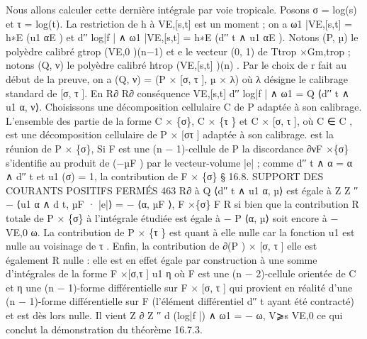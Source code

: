 \documentclass[
  10pt,
]{article}
\newenvironment{Shaded}{}{}
\newcommand{\NormalTok}[1]{#1}
\begin{document}
\begin{Shaded}
\begin{Highlighting}[]
\NormalTok{Nous allons calculer cette dernière intégrale par voie tropicale. Posons σ = log(s) et}
\NormalTok{τ = log(t). La restriction de h à VE,[s,t] est un moment ; on a ω1 |VE,[s,t] = h∗E (u1 αE ) et}
\NormalTok{d′′ log|f | ∧ ω1 |VE,[s,t] = h∗E (d′′ t ∧ u1 αE ).}
\NormalTok{   Notons (P, µ) le polyèdre calibré gtrop (VE,0 )(n−1) et e le vecteur (0, 1) de Ttrop ×Gm,trop ;}
\NormalTok{notons (Q, ν) le polyèdre calibré htrop (VE,[s,t] )(n) . Par le choix de r fait au début de la}
\NormalTok{preuve, on a (Q, ν) = (P × [σ, τ ], µ × λ) où λ désigne le calibrage standard de [σ, τ ]. En}
\NormalTok{                R∂                            R∂}
\NormalTok{conséquence VE,[s,t] d′′ log|f | ∧ ω1 = Q ⟨d′′ t ∧ u1 α, ν⟩.}
\NormalTok{   Choisissons une décomposition cellulaire C de P adaptée à son calibrage. L’ensemble}
\NormalTok{des partie de la forme C × \{σ\}, C × \{τ \} et C × [σ, τ ], où C ∈ C , est une décomposition}
\NormalTok{cellulaire de P × [στ ] adaptée à son calibrage. est la réunion de P × \{σ\}, Si F est}
\NormalTok{une (n − 1){-}cellule de P la discordance ∂νF ×\{σ\} s’identifie au produit de (−µF ) par le}
\NormalTok{vecteur{-}volume |e| ; comme d′′ t ∧ α = α ∧ d′′ t et u1 (σ) = 1, la contribution de F × \{σ\}}
\NormalTok{                         § 16.8. SUPPORT DES COURANTS POSITIFS FERMÉS                            463}
\NormalTok{    R∂}
\NormalTok{à   Q}
\NormalTok{         ⟨d′′ t ∧ u1 α, µ⟩ est égale à}
\NormalTok{                                Z                                Z}
\NormalTok{                                                ′′}
\NormalTok{                              −        ⟨u1 α ∧ d t, µF · |e|⟩ = − ⟨α, µF ⟩,}
\NormalTok{                               F ×\{σ\}                            F}
\NormalTok{                                                                                   R}
\NormalTok{si bien que la contribution}
\NormalTok{                 R           totale de P × \{σ\} à l’intégrale étudiée est égale à − P ⟨α, µ⟩}
\NormalTok{soit encore à − VE,0 ω.}
\NormalTok{   La contribution de P × \{τ \} est quant à elle nulle car la fonction u1 est nulle au}
\NormalTok{voisinage de τ . Enfin, la contribution de ∂(P ) × [σ, τ ] elle est également}
\NormalTok{                                                                           R nulle : elle est}
\NormalTok{en effet égale par construction à une somme d’intégrales de la forme F ×[σ,τ ] u1 η où F}
\NormalTok{est une (n − 2){-}cellule orientée de C et η une (n − 1){-}forme différentielle sur F × [σ, τ ]}
\NormalTok{qui provient en réalité d’une (n − 1){-}forme différentielle sur F (l’élément différentiel d′′ t}
\NormalTok{ayant été contracté) et est dès lors nulle.}
\NormalTok{   Il vient                   Z ∂                       Z}
\NormalTok{                                    ′′}
\NormalTok{                                   d (log|f |) ∧ ω1 = −       ω,}
\NormalTok{                                   V⩾s                       VE,0}
\NormalTok{ce qui conclut la démonstration du théorème 16.7.3.}
\end{Highlighting}
\end{Shaded}
\end{document}
